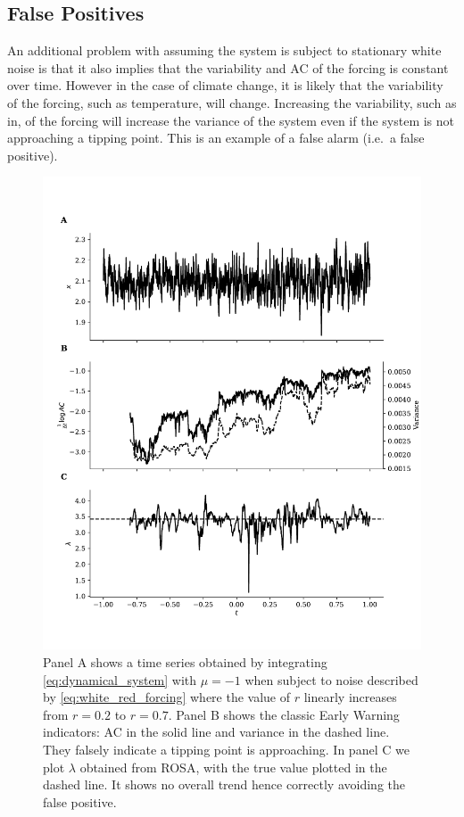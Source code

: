 \subsection{False Positives}
An additional problem with assuming the system is subject to stationary white noise is that it also implies that the
variability and AC of the forcing is constant over time. 
However in the case of 
climate change, it is likely that the variability of the forcing,
such as temperature, will change\cite{Huntingford2013}. 
Increasing the variability, such as in\cite{Boers2021a}, of the forcing will increase the variance of the system even
if the system is not approaching a tipping point. This is an example of a false
alarm (i.e.\ a false positive). 

\begin{figure}
\includegraphics[width=\textwidth,keepaspectratio]{figure2}
\caption[Early Warning Signal False Positive]{Panel A shows a time series obtained by integrating  \cref{eq:dynamical_system} with $\mu = -1$ when subject to
  noise described by \cref{eq:white_red_forcing} where the
  value of $r$ linearly increases from $r=0.2$ to $r=0.7$. Panel B 
  shows the classic Early Warning indicators: AC in the solid
  line and variance in the dashed line. They falsely indicate a
  tipping point is approaching. In panel C we plot $\lambda$ obtained
  from ROSA, with the true value plotted in the dashed line. It shows
  no overall trend hence correctly avoiding the false positive.}\label{fig:changing_forcing}
\end{figure}


